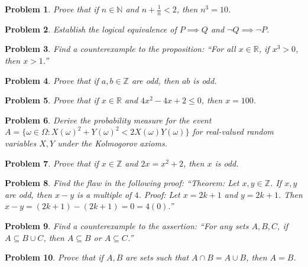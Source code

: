 \documentclass[12pt]{article}
\newtheorem{problem}{Problem}
\begin{document}
\begin{problem}
Prove that if $n \in \mathbb{N}$ and $n + \frac{1}{n} < 2$, then $n^3 = 10$.
\end{problem}

\begin{problem}
Establish the logical equivalence of $P \implies Q$ and $\neg Q \implies \neg P$.
\end{problem}

\begin{problem}
Find a counterexample to the proposition: ``For all $x \in \mathbb{R}$, if $x^3 > 0$, then $x > 1$.''
\end{problem}

\begin{problem}
Prove that if $a, b \in \mathbb{Z}$ are odd, then $ab$ is odd.
\end{problem}

\begin{problem}
Prove that if $x \in \mathbb{R}$ and $4x^2 - 4x + 2 \le 0$, then $x = 100$.
\end{problem}

\begin{problem}
Derive the probability measure for the event $A = \{ \omega \in \Omega : X(\omega)^2 + Y(\omega)^2 < 2X(\omega)Y(\omega) \}$ for real-valued random variables $X, Y$ under the Kolmogorov axioms.
\end{problem}

\begin{problem}
Prove that if $x \in \mathbb{Z}$ and $2x = x^2 + 2$, then $x$ is odd.
\end{problem}

\begin{problem}
Find the flaw in the following proof: ``Theorem: Let $x, y \in \mathbb{Z}$. If $x, y$ are odd, then $x-y$ is a multiple of $4$. Proof: Let $x = 2k+1$ and $y = 2k+1$. Then $x-y = (2k+1) - (2k+1) = 0 = 4(0)$.''
\end{problem}

\begin{problem}
Find a counterexample to the assertion: ``For any sets $A, B, C$, if $A \subseteq B \cup C$, then $A \subseteq B$ or $A \subseteq C$.''
\end{problem}

\begin{problem}
Prove that if $A, B$ are sets such that $A \cap B = A \cup B$, then $A = B$.
\end{problem}

\newpage
\end{document}

